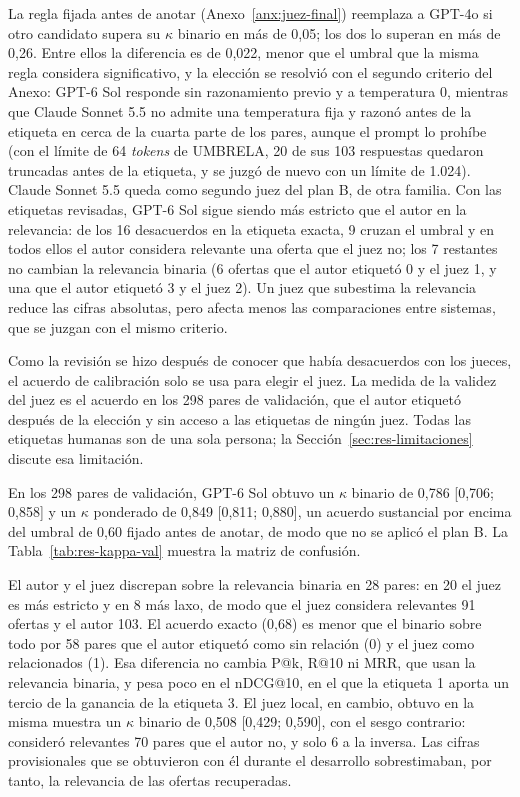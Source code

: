 

La regla fijada antes de anotar (Anexo~\ref{anx:juez-final}) reemplaza a GPT-4o si otro candidato supera su $\kappa$ binario en más de 0,05; los dos lo superan en más de 0,26. Entre ellos la diferencia es de 0,022, menor que el umbral que la misma regla considera significativo, y la elección se resolvió con el segundo criterio del Anexo: GPT-6 Sol responde sin razonamiento previo y a temperatura 0, mientras que Claude Sonnet 5.5 no admite una temperatura fija y razonó antes de la etiqueta en cerca de la cuarta parte de los pares, aunque el prompt lo prohíbe (con el límite de 64 \textit{tokens} de UMBRELA, 20 de sus 103 respuestas quedaron truncadas antes de la etiqueta, y se juzgó de nuevo con un límite de 1.024). Claude Sonnet 5.5 queda como segundo juez del plan B, de otra familia. Con las etiquetas revisadas, GPT-6 Sol sigue siendo más estricto que el autor en la relevancia: de los 16 desacuerdos en la etiqueta exacta, 9 cruzan el umbral y en todos ellos el autor considera relevante una oferta que el juez no; los 7 restantes no cambian la relevancia binaria (6 ofertas que el autor etiquetó 0 y el juez 1, y una que el autor etiquetó 3 y el juez 2). Un juez que subestima la relevancia reduce las cifras absolutas, pero afecta menos las comparaciones entre sistemas, que se juzgan con el mismo criterio.

Como la revisión se hizo después de conocer que había desacuerdos con los jueces, el acuerdo de calibración solo se usa para elegir el juez. La medida de la validez del juez es el acuerdo en los 298 pares de validación, que el autor etiquetó después de la elección y sin acceso a las etiquetas de ningún juez. Todas las etiquetas humanas son de una sola persona; la Sección~\ref{sec:res-limitaciones} discute esa limitación.

En los 298 pares de validación, GPT-6 Sol obtuvo un $\kappa$ binario de 0,786 [0,706; 0,858] y un $\kappa$ ponderado de 0,849 [0,811; 0,880], un acuerdo sustancial por encima del umbral de 0,60 fijado antes de anotar, de modo que no se aplicó el plan B. La Tabla~\ref{tab:res-kappa-val} muestra la matriz de confusión.



El autor y el juez discrepan sobre la relevancia binaria en 28 pares: en 20 el juez es más estricto y en 8 más laxo, de modo que el juez considera relevantes 91 ofertas y el autor 103. El acuerdo exacto (0,68) es menor que el binario sobre todo por 58 pares que el autor etiquetó como sin relación (0) y el juez como relacionados (1). Esa diferencia no cambia P@k, R@10 ni MRR, que usan la relevancia binaria, y pesa poco en el nDCG@10, en el que la etiqueta 1 aporta un tercio de la ganancia de la etiqueta 3. El juez local, en cambio, obtuvo en la misma muestra un $\kappa$ binario de 0,508 [0,429; 0,590], con el sesgo contrario: consideró relevantes 70 pares que el autor no, y solo 6 a la inversa. Las cifras provisionales que se obtuvieron con él durante el desarrollo sobrestimaban, por tanto, la relevancia de las ofertas recuperadas.

